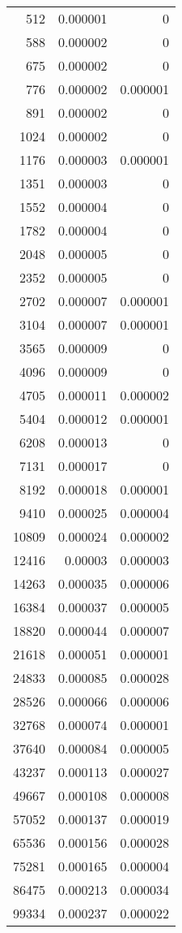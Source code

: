 \begin{longtable}{r r r}
512 & 0.000001 & 0 \\
588 & 0.000002 & 0 \\
675 & 0.000002 & 0 \\
776 & 0.000002 & 0.000001 \\
891 & 0.000002 & 0 \\
1024 & 0.000002 & 0 \\
1176 & 0.000003 & 0.000001 \\
1351 & 0.000003 & 0 \\
1552 & 0.000004 & 0 \\
1782 & 0.000004 & 0 \\
2048 & 0.000005 & 0 \\
2352 & 0.000005 & 0 \\
2702 & 0.000007 & 0.000001 \\
3104 & 0.000007 & 0.000001 \\
3565 & 0.000009 & 0 \\
4096 & 0.000009 & 0 \\
4705 & 0.000011 & 0.000002 \\
5404 & 0.000012 & 0.000001 \\
6208 & 0.000013 & 0 \\
7131 & 0.000017 & 0 \\
8192 & 0.000018 & 0.000001 \\
9410 & 0.000025 & 0.000004 \\
10809 & 0.000024 & 0.000002 \\
12416 & 0.00003 & 0.000003 \\
14263 & 0.000035 & 0.000006 \\
16384 & 0.000037 & 0.000005 \\
18820 & 0.000044 & 0.000007 \\
21618 & 0.000051 & 0.000001 \\
24833 & 0.000085 & 0.000028 \\
28526 & 0.000066 & 0.000006 \\
32768 & 0.000074 & 0.000001 \\
37640 & 0.000084 & 0.000005 \\
43237 & 0.000113 & 0.000027 \\
49667 & 0.000108 & 0.000008 \\
57052 & 0.000137 & 0.000019 \\
65536 & 0.000156 & 0.000028 \\
75281 & 0.000165 & 0.000004 \\
86475 & 0.000213 & 0.000034 \\
99334 & 0.000237 & 0.000022 \\

\end{longtable}
